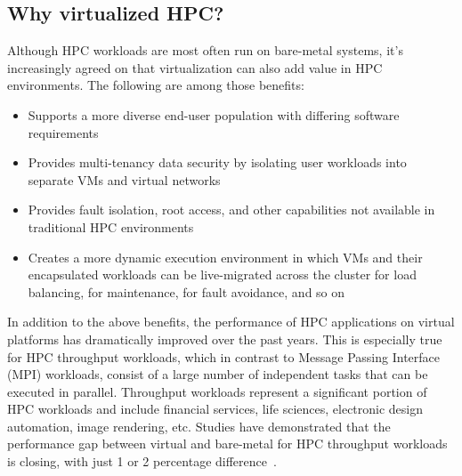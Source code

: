 \subsection{Why virtualized HPC?}
Although HPC workloads are most often run on bare-metal systems, %
it's increasingly agreed on that virtualization can also add value in HPC environments. 
The following are among those benefits:
\begin{itemize}
	\item Supports a more diverse end-user population with differing software requirements
	\item Provides multi-tenancy data security by isolating user workloads into separate VMs and virtual networks
	\item Provides fault isolation, root access, and other capabilities not available in traditional HPC environments
	\item Creates a more dynamic execution environment in which VMs and their encapsulated workloads 
	can be live-migrated across the cluster for load balancing, for maintenance, for fault avoidance, and so on
\end{itemize}

In addition to the above benefits, the performance of HPC applications on virtual platforms has dramatically 
improved over the past years. This is especially true for HPC throughput workloads, which in contrast to Message Passing Interface (MPI) workloads, 
consist of a large number of independent tasks that can be executed in parallel. Throughput workloads represent a 
significant portion of HPC workloads and include financial services, life sciences, electronic design automation, image rendering, etc. 
Studies have demonstrated that the performance gap between virtual and bare-metal for HPC throughput workloads is 
closing, with just 1 or 2 percentage difference~\cite{michael2018overcommit}. 


